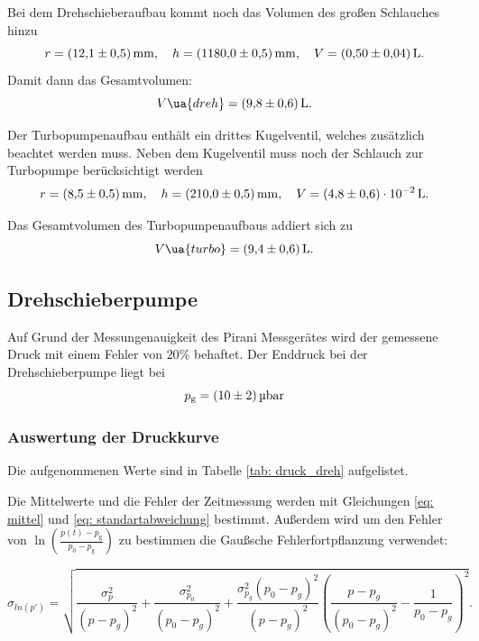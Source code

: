 Bei dem Drehschieberaufbau kommt noch das Volumen des großen Schlauches  hinzu
\begin{equation*}
  r=\SI{12.1\pm 0.5}{\milli\meter}, \quad h=\SI{1180\pm0.5}{\milli\meter}, \quad V=\SI{ 0.5\pm0.04}{\litre}.
\end{equation*}
Damit dann das Gesamtvolumen:
\begin{equation}
  \label{eq:volumen_drehschieber}
  V\ua{dreh}=\SI{9.8\pm0.6}{\litre}.
\end{equation}

Der Turbopumpenaufbau enthält ein drittes Kugelventil, welches zusätzlich beachtet werden muss.
Neben dem Kugelventil muss noch der Schlauch zur Turbopumpe  berücksichtigt werden
\begin{equation*}
  r=\SI{8.5\pm 0.5}{\milli\meter}, \quad h=\SI{210\pm0.5}{\milli\meter}, \quad V=\SI{ 4.8\pm0.6 e-2}{\litre}.
\end{equation*}

Das Gesamtvolumen des Turbopumpenaufbaus addiert sich zu
\begin{equation}
  \label{eq:volume_turbo}
  V\ua{turbo}=\SI{9.4\pm0.6}{\litre}.
\end{equation}
\subsection{Drehschieberpumpe}
Auf Grund der Messungenauigkeit des Pirani Messgerätes wird der gemessene
Druck mit einem Fehler von $20\%$ behaftet.
Der Enddruck bei der Drehschieberpumpe liegt bei
\begin{equation}
  \label{eq:enddruck_drehschieber}
  p_{\mathrm{g}}=\SI{10 \pm 2 }{\micro\bar}
\end{equation}

\subsubsection{Auswertung der Druckkurve}

Die aufgenommenen Werte sind in Tabelle \ref{tab: druck_dreh} aufgelistet.

Die Mittelwerte und die Fehler der Zeitmessung werden mit Gleichungen \eqref{eq: mittel} und
\eqref{eq: standartabweichung} bestimmt. Außerdem wird um den Fehler von $\ln(\frac{ p(t)-p_{ \mathrm{g} } }{ p_0-p_{ \mathrm{g} } })$
 zu bestimmen die Gaußsche Fehlerfortpflanzung verwendet:

\begin{equation}
  \label{eq: fehler_ln_druck}
  \sigma_{ln(p')}=\sqrt{\frac{\sigma_{p}^{2}}{\left(p - p_{g}\right)^{2}} + \frac{\sigma_{p_{0}}^{2}}{\left(p_{0} - p_{g}\right)^{2}} + \frac{\sigma_{p_{g}}^{2} \left(p_{0} - p_{g}\right)^{2}}{\left(p - p_{g}\right)^{2}} \left(\frac{p - p_{g}}{\left(p_{0} - p_{g}\right)^{2}} - \frac{1}{p_{0} - p_{g}}\right)^{2}}.
\end{equation}

